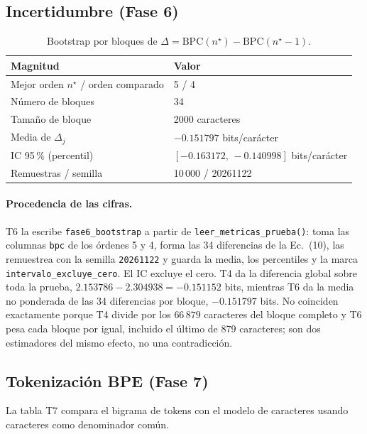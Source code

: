 \documentclass[11pt,letterpaper]{article}
\begin{document}
	\subsection{Incertidumbre (Fase 6)}
	\begin{table}[htbp]
		\centering
		\caption{Bootstrap por bloques de $\Delta = \mathrm{BPC}(n^\star) - \mathrm{BPC}(n^\star - 1)$.}
		\label{tab:T4}
		\begin{tabular}{l l}
			\toprule
			Magnitud & Valor \\
			\midrule
			Mejor orden $n^\star$ / orden comparado & 5 / 4 \\
			Número de bloques & 34 \\
			Tamaño de bloque & 2000 caracteres \\
			Media de $\Delta_j$ & $-0.151797$ bits/carácter \\
			IC 95\,\% (percentil) & $[-0.163172,\, -0.140998]$ bits/carácter \\
			Remuestras / semilla & 10\,000 / 20261122 \\
			\bottomrule
		\end{tabular}
	\end{table}
	
	\paragraph{Procedencia de las cifras.}
	T6 la escribe \texttt{fase6\_bootstrap} a partir de \texttt{leer\_metricas\_prueba()}: toma las columnas \texttt{bpc} de los órdenes 5 y 4, forma las 34 diferencias de la Ec.~(10), las remuestrea con la semilla \texttt{20261122} y guarda la media, los percentiles y la marca \texttt{intervalo\_excluye\_cero}. El IC excluye el cero. T4 da la diferencia global sobre toda la prueba, $2.153786 - 2.304938 = -0.151152$ bits, mientras T6 da la media no ponderada de las 34 diferencias por bloque, $-0.151797$ bits. No coinciden exactamente porque T4 divide por los $66\,879$ caracteres del bloque completo y T6 pesa cada bloque por igual, incluido el último de $879$ caracteres; son dos estimadores del mismo efecto, no una contradicción.
	
	\subsection{Tokenización BPE (Fase 7)}
	
	La tabla T7 compara el bigrama de tokens con el modelo de caracteres usando caracteres como denominador común.
	
\end{document}
